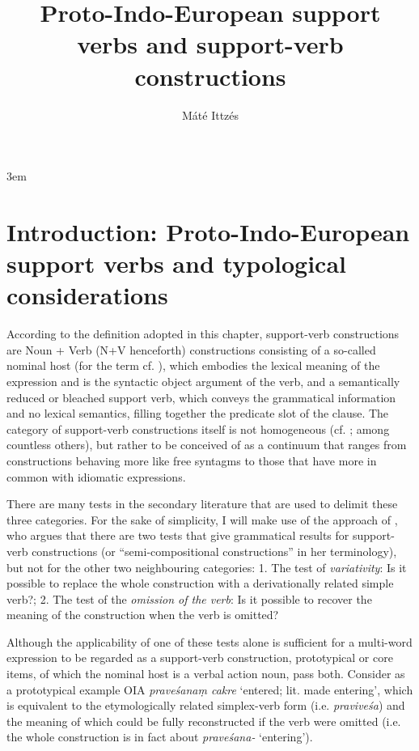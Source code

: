 \documentclass[output=paper,colorlinks,citecolor=brown]{langscibook}
\author[Máté Ittzés]{Máté Ittzés\affiliation{Eötvös Loránd University, Budapest }}
\title{Proto-Indo-European support verbs and support-verb constructions}
\begin{document}
\emergencystretch 3em

\maketitle

\section{Introduction: Proto-Indo-European support verbs and typological considerations}

According to the definition adopted in this chapter, support-verb constructions are Noun + Verb (N+V henceforth) constructions consisting of a so-called nominal host (for the term cf. \citealt[433]{Mohanan1997}), which embodies the lexical meaning of the expression and is the syntactic object argument of the verb, and a semantically reduced or bleached support verb, which conveys the grammatical information and no lexical semantics, filling together the predicate slot of the clause. The category of support-verb constructions itself is not homogeneous (cf. \citealt[21--18]{Kamber2008}; \citealt{Vincze2008} among countless others), but rather to be conceived of as a continuum that ranges from constructions behaving more like free syntagms to those that have more in common with idiomatic expressions.

There are many tests in the secondary literature that are used to delimit these three categories. For the sake of simplicity, I will make use of the approach of \citet[288--294]{Vincze2008}, who argues that there are two tests that give grammatical results for support-verb constructions (or “semi-compositional constructions” in her terminology), but not for the other two neighbouring categories: 1. The test of \textit{variativity}: Is it possible to replace the whole construction with a derivationally related simple verb?; 2. The test of the \textit{omission of the verb}: Is it possible to recover the meaning of the construction when the verb is omitted?

Although the applicability of one of these tests alone is sufficient for a multi-word expression to be regarded as a support-verb construction, prototypical or core items, of which the nominal host is a verbal action noun, pass both. Consider as a prototypical example OIA \textit{praveśanaṃ cakre}  ‘entered; lit. made entering’, which is equivalent to the etymologically related simplex-verb form (i.e. \textit{praviveśa}) and the meaning of which could be fully reconstructed if the verb were omitted (i.e. the whole construction is in fact about \textit{praveśana-} ‘entering’).
\end{document}
